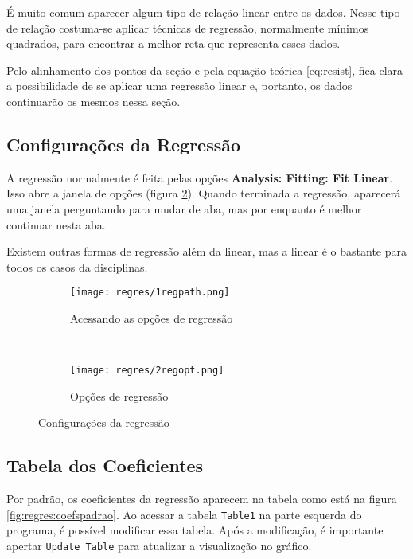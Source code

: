 É muito comum aparecer algum tipo de relação linear entre os dados. Nesse tipo de relação costuma-se aplicar técnicas de regressão, normalmente mínimos quadrados, para encontrar a melhor reta que representa esses dados.

Pelo alinhamento dos pontos da seção  e pela equação teórica \ref{eq:resist}, fica clara a possibilidade de se aplicar uma regressão linear e, portanto, os dados continuarão os mesmos nessa seção.


\subsection{Configurações da Regressão}

    A regressão normalmente é feita pelas opções \textbf{Analysis: Fitting: Fit Linear}. Isso abre a janela de opções (figura \ref{fig:regres:opt}). Quando terminada a regressão, aparecerá uma janela perguntando para mudar de aba, mas por enquanto é melhor continuar nesta aba.

    Existem outras formas de regressão além da linear, mas a linear é o bastante para todos os casos da disciplinas.

    \begin{figure}[htbp]
        \centering
        \begin{subfigure}{0.60\textwidth}
            \centering
            \texttt{[image: regres/1regpath.png]}

            \caption{Acessando as opções de regressão}
            \label{fig:regres:path}
        \end{subfigure}
        ~
        \begin{subfigure}{0.35\textwidth}
            \centering
            \texttt{[image: regres/2regopt.png]}

            \caption{Opções de regressão}
            \label{fig:regres:opt}
        \end{subfigure}
        \caption{Configurações da regressão}
        \label{fig:regres:config}
    \end{figure}


\subsection{Tabela dos Coeficientes}

    Por padrão, os coeficientes da regressão aparecem na tabela como está na figura \ref{fig:regres:coefspadrao}. Ao acessar a tabela \texttt{Table1} na parte esquerda do programa, é possível modificar essa tabela. Após a modificação, é importante apertar \texttt{Update Table} para atualizar a visualização no gráfico.

